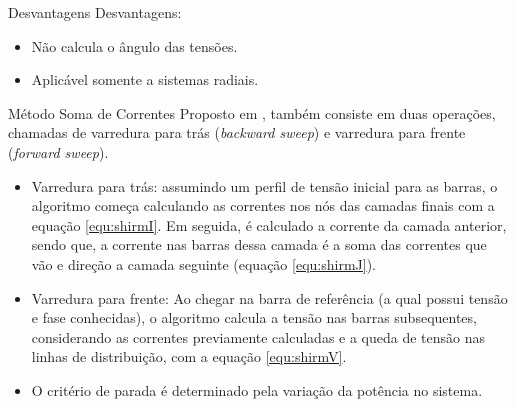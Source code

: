 \documentclass[10pt]{beamer}
\begin{document}
\begin{frame}{Desvantagens}
Desvantagens:
    \begin{itemize}
        \item Não calcula o ângulo das tensões.
        \item Aplicável somente a sistemas radiais.
    \end{itemize}
\end{frame}

\begin{frame}{Método Soma de Correntes}
    Proposto em \cite{ShirmohammadiMono, Shirmohammadi3F}, também consiste em duas operações, chamadas de varredura para trás (\textit{backward sweep}) e varredura para frente (\textit{forward sweep}). 
    
    \begin{itemize}
        \item Varredura para trás: assumindo um perfil de tensão inicial para as barras, o algoritmo começa calculando as correntes nos nós das camadas finais com a equação \ref{equ:shirmI}. Em seguida, é calculado a corrente da camada anterior, sendo que, a corrente nas barras dessa camada é a soma das correntes que vão e direção a camada seguinte (equação \ref{equ:shirmJ}).
        
        \item Varredura para frente: Ao chegar na barra de referência (a qual possui tensão e fase conhecidas), o algoritmo calcula a tensão nas barras subsequentes, considerando as correntes previamente calculadas e a queda de tensão nas linhas de distribuição, com a equação \ref{equ:shirmV}.
        
        \item O critério de parada é determinado pela variação da potência no sistema.
    \end{itemize}
\end{frame}
\end{document}
